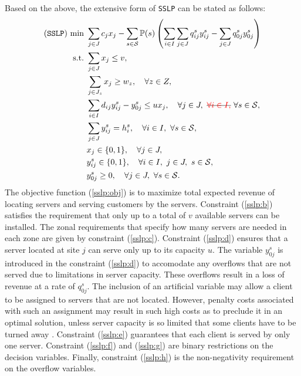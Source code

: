 Based on the above, the extensive form of \texttt{SSLP} can be stated as follows:
\begin{subequations}
	\begin{align}
	(\texttt{SSLP})\ \textrm{min}\ &	\sum_{j\in J}c_j x_j - \sum_{s\in\mathcal{S}}\PP(s)\left(\sum_{i\in I}\sum_{j\in J}q_{ij}^s y_{ij}^s - \sum_{j\in J}q_{0j}^s y_{0j}^s \right) \label{sslp:obj} \\ 
	\textrm{s.t.}\ &\sum_{j\in J}x_j\le v,\label{sslp:b}\\ 
	&\sum_{j\in J_z}x_j\ge w_z,\quad\forall z\in Z,\label{sslp:c}\\
	&\sum_{i\in I}d_{ij}y_{ij}^s - y_{0j}^s\le ux_j,\quad\forall j\in J,\ \stkout{\textcolor{red}{\forall i\in I,}}\ \forall s\in\mathcal{S}, \label{sslp:d} \\
	&\sum_{j\in J}y_{ij}^s=h_i^s,\quad\forall i\in I,\ \forall s\in \mathcal{S}, \label{sslp:e}\\
	&x_j\in\{0,1\},\quad\forall j\in J,\label{sslp:f}\\
	&y_{ij}^s\in\{0,1\},\quad\forall i\in I,\ j\in J,\ s\in\mathcal{S}, \label{sslp:g}\\
	&y_{0j}^s\ge 0,\quad\forall j\in J,\ \forall s\in\mathcal{S} \label{sslp:h}.
	\end{align}
\end{subequations}
The objective function (\ref{sslp:obj}) is to maximize total expected revenue of locating servers and serving customers by the servers. Constraint (\ref{sslp:b}) satisfies the requirement that only up to a total of $v$ available servers can be installed. The zonal requirements that specify how many servers are needed in each zone are given by constraint (\ref{sslp:c}). Constraint (\ref{sslp:d}) ensures that a server located at site $j$ can serve only up to its capacity $u$. The variable $y_{0j}^s$ is introduced in the constraint (\ref{sslp:d}) to accomodate any overflows that are not served due to limitations in server capacity. These overflows result in a loss of revenue at a rate of $q_{0j}^s$. The inclusion of an artificial variable may allow a client to be assigned to servers that are not located. However, penalty costs associated with such an assignment may result in such high costs as to preclude it in an optimal solution, unless server capacity is so limited that some clients have to be turned away \cite{journal:NS2005}. Constraint (\ref{sslp:e}) guarantees that each client is served by only one server. Constraint (\ref{sslp:f}) and (\ref{sslp:g}) are binary restrictions on the decision variables. Finally, constraint (\ref{sslp:h}) is the non-negativity requirement on the overflow variables.
